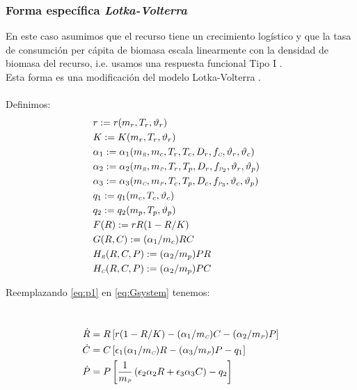 \subsubsection{Forma espec\'ifica  \emph{Lotka-Volterra}}
En este caso asumimos que el recurso tiene un crecimiento log\'istico y que la tasa de consumci\'on per c\'apita de biomasa escala linearmente con la densidad de biomasa del recurso, i.e. usamos una respuesta funcional Tipo I \citep{gotelliprimer}.\\
Esta forma es una modificaci\'on del modelo Lotka-Volterra \citep{gotelliprimer}.\\
\mbox{}\\
Definimos:
\begin{equation}\label{eq:p1}
\begin{aligned}
&r := r(m_r,T_r,\vartheta_r)&\\ 
&K := K(m_r,T_r,\vartheta_r)&\\
&\alpha_{1} := \alpha_{1}(m_{\textit{\tiny R}},m_c,T_r,T_c,D_r,f_{\textit{\tiny C}},\vartheta_r,\vartheta_c)&\\
&\alpha_{2} := \alpha_{2}(m_{\textit{\tiny R}},m_{\textit{\tiny P}},T_r,T_p,D_r,f_{\textit{\tiny P}_2},\vartheta_r,\vartheta_p)&\\
&\alpha_{3} := \alpha_{3}(m_{\textit{\tiny C}},m_{\textit{\tiny P}},T_c,T_p,D_c,f_{\textit{\tiny P}_3},\vartheta_c,\vartheta_p)& \\
&q_1 := q_1(m_c,T_c,\vartheta_c)& \\ 
&q_2 := q_2(m_p,T_p,\vartheta_p)&\\
&F(R):= rR(1-R/K)& \\
&G(R,C):= (\alpha_1/m_c)RC &\\ 
&H_{\textit{\tiny R}}(R,C,P):= (\alpha_2/m_p)PR&\\
&H_{\textit{\tiny C}}(R,C,P):= (\alpha_2/m_p)PC&
\end{aligned}
\end{equation}

Reemplazando \eqref{eq:p1} en \eqref{eq:Gsystem} tenemos:

\
\begin{equation}
\begin{aligned} 
\dot{R} &= R\left[r(1-R/K)- (\alpha_{1}/m_{\textit{\tiny C}}) C -(\alpha_{2}/m_{\textit{\tiny P}}) P \right] \\
\dot{C} &= C \left[\epsilon_1 (\alpha_{1}/m_{\textit{\tiny C}}) R - (\alpha_{3} /m_{\textit{\tiny P}}) P - q_1\right] \\
\dot{P} &= P \left[\frac{1}{m_{\textit{\tiny P}}}\left(\epsilon_2 \alpha_{2}R + \epsilon_3 \alpha_{3}C \right) - q_2 \right]
\end{aligned}
\end{equation}

